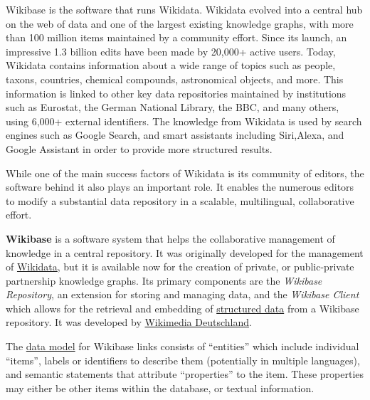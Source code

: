 \documentclass[
  letterpaper,
  DIV=11,
  numbers=noendperiod]{scrreprt}
\begin{document}
Wikibase is the software that runs Wikidata. Wikidata evolved into a
central hub on the web of data and one of the largest existing knowledge
graphs, with more than 100 million items maintained by a community
effort. Since its launch, an impressive 1.3 billion edits have been made
by 20,000+ active users. Today, Wikidata contains information about a
wide range of topics such as people, taxons, countries, chemical
compounds, astronomical objects, and more. This information is linked to
other key data repositories maintained by institutions such as Eurostat,
the German National Library, the BBC, and many others, using 6,000+
external identifiers. The knowledge from Wikidata is used by search
engines such as Google Search, and smart assistants including
Siri,Alexa, and Google Assistant in order to provide more structured
results.

While one of the main success factors of Wikidata is its community of
editors, the software behind it also plays an important role. It enables
the numerous editors to modify a substantial data repository in a
scalable, multilingual, collaborative effort.

\textbf{Wikibase} is a software system that helps the collaborative
management of knowledge in a central repository. It was originally
developed for the management of
\href{https://en.wikipedia.org/wiki/Wikidata}{Wikidata}, but it is
available now for the creation of private, or public-private partnership
knowledge graphs. Its primary components are the \emph{Wikibase
Repository}, an extension for storing and managing data, and the
\emph{Wikibase Client} which allows for the retrieval and embedding of
\href{https://en.wikipedia.org/wiki/Structured_data}{structured data}
from a Wikibase repository. It was developed by
\href{https://en.wikipedia.org/wiki/Wikimedia_Deutschland}{Wikimedia
Deutschland}.

The \href{https://en.wikipedia.org/wiki/Data_model}{data model} for
Wikibase links consists of ``entities'' which include individual
``items'', labels or identifiers to describe them (potentially in
multiple languages), and semantic statements that attribute
``properties'' to the item. These properties may either be other items
within the database, or textual information.
\end{document}
